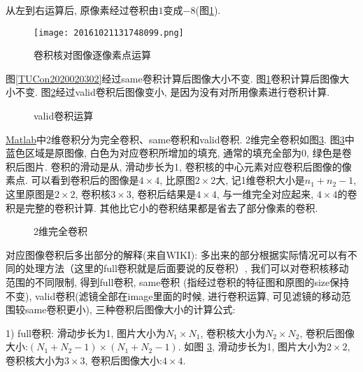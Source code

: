 \begin{example}
从左到右运算后, 原像素经过卷积由$1$变成$-8$(图\ref{CNN20161021131748099}).
\begin{figure}[H]
\centering
\texttt{[image: 20161021131748099.png]}
\caption{卷积核对图像逐像素点运算}
\label{CNN20161021131748099}
\end{figure}
\vspace{-0.4cm}
\end{example}

图\ref{TUCon2020020302}经过same卷积计算后图像大小不变. 图\ref{CNN20161021131748099}卷积计算后图像大小不变. 图\ref{20161021135241205}经过valid卷积后图像变小, 是因为没有对所用像素进行卷积计算.
\begin{figure}[H]
\centering
{}
\caption{valid卷积运算}
\label{20161021135241205}
\end{figure}

\href{https://cn.mathworks.com/help/matlab/ref/conv2.html?requestedDomain=www.mathworks.com}{Matlab}中2维卷积分为完全卷积、same卷积和valid卷积.
2维完全卷积如图\ref{CNN20161021141659634}.
图\ref{CNN20161021141659634}中蓝色区域是原图像, 白色为对应卷积所增加的填充, 通常的填充全部为0, 绿色是卷积后图片.
卷积的滑动是从, 滑动步长为1, 卷积核的中心元素对应卷积后图像的像素点.
可以看到卷积后的图像是$4\times 4$, 比原图$2\times 2$大, 记1维卷积大小是$n_1+n_2-1$, 这里原图是$2\times 2$, 卷积核$3\times 3$, 卷积后结果是$4\times 4$, 与一维完全对应起来,
$4\times 4$的卷积是完整的卷积计算. 其他比它小的卷积结果都是省去了部分像素的卷积.
\begin{figure}[H]
\centering
{}
\caption{2维完全卷积}
\label{CNN20161021141659634}
\end{figure}
对应图像卷积后多出部分的解释(来自WIKI): 多出来的部分根据实际情况可以有不同的处理方法（这里的full卷积就是后面要说的反卷积）,
我们可以对卷积核移动范围的不同限制, 得到full卷积, same卷积 (指经过卷积的特征图和原图的size保持不变), valid卷积(滤镜全部在image里面的时候, 进行卷积运算, 可见滤镜的移动范围较same卷积更小), 三种卷积后图像大小的计算公式:

1) full卷积: 滑动步长为1, 图片大小为$N_1\times N_1$, 卷积核大小为$N_2\times N_2$, 卷积后图像大小:$(N_1+N_2-1) \times (N_1+N_2-1)$.
如图 \ref{CNN20161021141659634}, 滑动步长为1, 图片大小为$2\times 2$, 卷积核大小为$3\times 3$, 卷积后图像大小:$4\times 4$.

